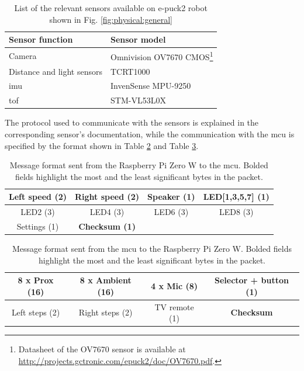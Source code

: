 \begin{table}[H]
    \centering
    \begin{tabular}{|l|l|}
        \hline
        \textbf{Sensor function} & \textbf{Sensor model} \\
        \hline
        Camera & Omnivision OV7670 CMOS\footnote{Datasheet of the OV7670 sensor is available at \url{http://projects.gctronic.com/epuck2/doc/OV7670.pdf}.} \\
        \hline
        Distance and light sensors & TCRT1000 \\
        \hline
        \ac{imu} & InvenSense MPU-9250 \\
        \hline
        \ac{tof} & STM-VL53L0X \cite{lakovic_application_2019} \\
        \hline
    \end{tabular}
    \caption{List of the relevant sensors available on e-puck2 robot shown in Fig. \ref{fig:physical:general}}
    \label{tab:physical:sensors}
\end{table}

The protocol used to communicate with the sensors is explained in the corresponding sensor's documentation, while the communication with the \ac{mcu} is specified by the format shown in Table \ref{tab:physical:rpi_to_mcu} and Table \ref{tab:physical:mcu_to_rpi}.

\begin{table}[H]
    \centering
    \begin{tabular}{c|c|c|c}
    \hline
    \textbf{Left speed (2)} & Right speed (2) & Speaker (1) & LED[1,3,5,7] (1)  \\
    \hline
    LED2 (3) & LED4 (3) & LED6 (3) & LED8 (3) \\
    \hline
    Settings (1) & \textbf{Checksum (1)} & & \\
    \hline
    \end{tabular}
    \caption[Message format sent from the Raspberry Pi Zero W to the \ac{mcu}]{Message format sent from the Raspberry Pi Zero W to the \ac{mcu}. Bolded fields highlight the most and the least significant bytes in the packet.}
    \label{tab:physical:rpi_to_mcu}
\end{table}

\begin{table}[H]
    \centering
    \begin{tabular}{c|c|c|c}
    \hline
    \textbf{8 x Prox (16)} & 8 x Ambient (16) & 4 x Mic (8) & Selector + button (1) \\
    \hline
    Left steps (2) & Right steps (2) & TV remote (1) & \textbf{Checksum} \\
    \hline
    \end{tabular}
    \caption[Message format sent from the \ac{mcu} to the Raspberry Pi Zero W]{Message format sent from the \ac{mcu} to the Raspberry Pi Zero W. Bolded fields highlight the most and the least significant bytes in the packet.}
    \label{tab:physical:mcu_to_rpi}
\end{table}

